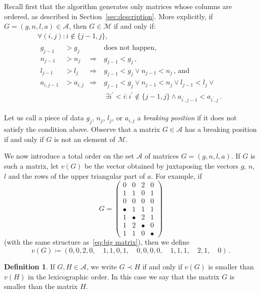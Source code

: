 \documentclass{amsart}
\theoremstyle{plain}
\theoremstyle{definition}
\newtheorem{definition}[theorem]{Definition}
\begin{document}
Recall first that the algorithm generates only matrices whose columns
are ordered, as described in Section~\ref{sec:description}. More
explicitly, if $G = (g, n, l, a) \in \mathcal{A}$, then $G \in
\mathcal{M}$ if and only if:
\begin{multline*}
  \forall (i,j)\colon
  i \not\in \{j-1, j\},\\
  \begin{aligned}
    g_{j-1} &> g_j &&\text{does not happen,}\\
    n_{j-1} &> n_j &\Rightarrow\  & g_{j-1} < g_j\,\text{,}\\
    l_{j-1} &> l_j &\Rightarrow\  & g_{j-1} < g_j \vee n_{j-1} < n_j\,\text{, and}\\
    a_{i,j-1} &> a_{i,j} &\Rightarrow\ & g_{j-1} < g_j \vee n_{j-1} < n_j \vee l_{j-1} < l_j \vee\\
    &&&\ \exists i^\prime < i: i^\prime \not\in \{j-1,j\} \wedge a_{i^\prime,j-1} < a_{i^\prime,j}\,\text{.}
  \end{aligned}
\end{multline*}

Let us call a piece of data $g_j$, $n_j$, $l_j$, or $a_{i,j}$ a
\emph{breaking position\/} if it does not satisfy the condition
above. Observe that a matrix $G \in \mathcal{A}$ has a breaking
position if and only if $G$ is not an element of $\mathcal{M}$.

We now introduce a total order on the set $\mathcal{A}$ of matrices $G
= (g,n,l,a)$. If $G$ is such a matrix, let $v(G)$ be the vector
obtained by juxtaposing the vectors $g$, $n$, $l$ and the rows of the
upper triangular part of $a$. For example, if
\[
  G = \begin{pmatrix}
    0 & 0 & 2 & 0\\
    1 & 1 & 0 & 1\\
    0 & 0 & 0 & 0\\
    \hline
    \bullet & 1 & 1 & 1\\
    1 & \bullet & 2 & 1\\
    1 & 2 & \bullet & 0\\
    1 & 1 & 0 & \bullet
  \end{pmatrix}
\]
(with the same structure as~\eqref{eq:big matrix}), then we define
\[
v(G) \coloneqq (0, 0, 2, 0,\quad 1, 1, 0, 1,\quad 0, 0, 0, 0,\quad 1, 1,
1,\quad 2, 1,\quad 0)\,\text{.}
\]

\begin{definition}\label{def:order}
  If $G, H \in \mathcal{A}$, we write $G \prec H$ if and only if
  $v(G)$ is smaller than $v(H)$ in the lexicographic order.  In this
  case we say that the matrix $G$ is smaller than the matrix $H$.
\end{definition}
\end{document}
